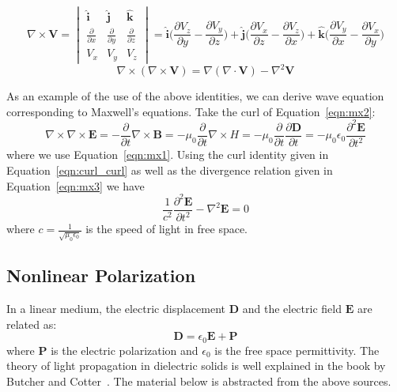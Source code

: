 \documentclass{article}[12pt]
\theoremstyle{plain}
\begin{document}
\begin{equation}
\nabla \times \mathbf{V} = \begin{vmatrix}
\hat{\mathbf{i}} & \hat{\mathbf{j}} & \hat{\mathbf{k}} \\
\frac{\partial}{\partial x} & \frac{\partial}{\partial y} & \frac{\partial}{\partial z} \\
V_x & V_y & V_z
\end{vmatrix}
= \hat{\mathbf{i}}\Big( \frac{\partial V_z}{\partial y} - \frac{\partial V_y}{\partial z}\Big)
+ \hat{\mathbf{j}}\Big( \frac{\partial V_x}{\partial z} - \frac{\partial V_z}{\partial x}\Big)
+ \hat{\mathbf{k}}\Big( \frac{\partial V_y}{\partial x} - \frac{\partial V_x}{\partial y}\Big)
\end{equation}
\begin{equation}
\nabla \times ( \nabla \times \mathbf{V} ) = \nabla(\nabla \cdot \mathbf{V}) - 
\nabla^2\mathbf{V} \label{eqn:curl_curl}
\end{equation}

As an example of the use of the above identities, we can derive wave equation
corresponding to Maxwell's
equations. Take the curl of Equation~\ref{eqn:mx2}:
\begin{equation}
\nabla \times \nabla \times \mathbf{E} = - \frac{\partial}{\partial t} \nabla \times \mathbf{B}
= -\mu_0 \frac{\partial}{\partial t} \nabla \times H
= -\mu_0 \frac{\partial}{\partial t} \frac{\partial \mathbf{D}}{\partial t}
= -\mu_0 \epsilon_0 \frac{\partial^2 \mathbf{E}}{\partial t^2} \label{eqn:wave}
\end{equation}
where we use Equation~\ref{eqn:mx1}.
 Using the curl identity given in
Equation~\ref{eqn:curl_curl} as well as the divergence relation given in Equation~\ref{eqn:mx3}
we have
\begin{equation}
\frac{1}{c^2} \frac{\partial^2 \mathbf{E}}{\partial t^2} - \nabla^2\mathbf{E} = 0 \label{eqn:wave1}
\end{equation}
where $c=\frac{1}{\sqrt{\mu_0\epsilon_0}}$ is the speed of light in free space.

\subsection{Nonlinear Polarization}
In a linear medium, the electric displacement $\mathbf{D}$ and the electric field $\mathbf{E}$
are related as:
\begin{equation}
\mathbf{D} = \epsilon_0\mathbf{E} + \mathbf{P} \label{eqn:electric_displacement}
\end{equation}
where $\mathbf{P}$ is the electric polarization and $\epsilon_0$ is the free space permittivity.
The theory of light propagation in dielectric solids is well explained in the book 
by Butcher and Cotter~\cite{butcher1991elements}. The material below is abstracted from the above sources.
\end{document}
